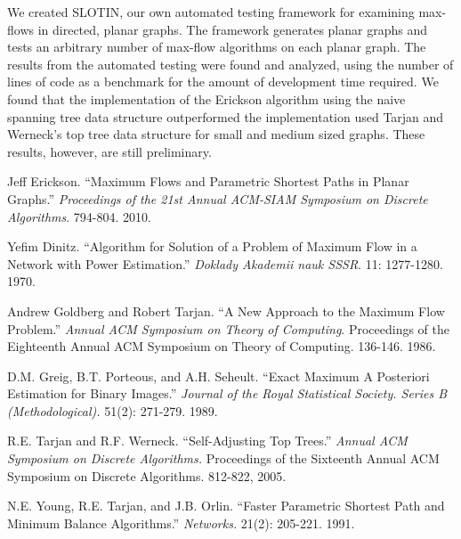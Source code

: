 \documentclass[12pt]{article}
\begin{document}
We created SLOTIN, our own automated testing framework for examining max-flows in directed, planar graphs. The framework generates planar graphs and tests an arbitrary number of max-flow algorithms on each planar graph. The results from the automated testing were found and analyzed, using the number of lines of code as a benchmark for the amount of development time required. We found that the implementation of the Erickson algorithm using the naive spanning tree data structure outperformed the implementation used Tarjan and Werneck's top tree data structure for small and medium sized graphs. These results, however, are still preliminary.

\newpage

\begin{thebibliography}{9}

        Jeff Erickson.
       ``Maximum Flows and Parametric Shortest Paths in Planar Graphs.''
       \emph{Proceedings of the 21st Annual ACM-SIAM Symposium on Discrete Algorithms}.
       794-804.
       2010.

        Yefim Dinitz.
        ``Algorithm for Solution of a Problem of Maximum Flow in a Network with Power Estimation.''
        \emph{Doklady Akademii nauk SSSR}.
        11: 1277-1280.
        1970.

        Andrew Goldberg and Robert Tarjan.
        ``A New Approach to the Maximum Flow Problem.''
        \emph{Annual ACM Symposium on Theory of Computing}.
        Proceedings of the Eighteenth Annual ACM Symposium on Theory of Computing.
        136-146.
        1986.

        D.M. Greig, B.T. Porteous, and A.H. Seheult.
        ``Exact Maximum A Posteriori Estimation for Binary Images.''
        \emph{Journal of the Royal Statistical Society. Series B (Methodological).}
        51(2): 271-279.
        1989.

        R.E. Tarjan and R.F. Werneck.
        ``Self-Adjusting Top Trees.''
        \emph{Annual ACM Symposium on Discrete Algorithms.}
        Proceedings of the Sixteenth Annual ACM Symposium on Discrete Algorithms.
        812-822,
        2005.

        N.E. Young, R.E. Tarjan, and J.B. Orlin. 
        ``Faster Parametric Shortest Path and Minimum Balance Algorithms.''
        \emph{Networks.}
        21(2): 205-221.
        1991.

\end{thebibliography}
\end{document}
